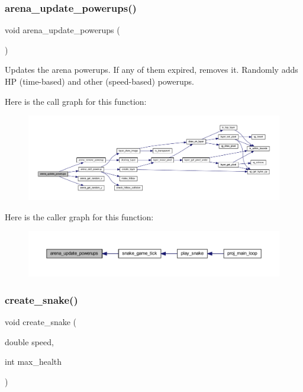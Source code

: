 \subsubsection{\texorpdfstring{arena\+\_\+update\+\_\+powerups()}{arena\_update\_powerups()}}
{\footnotesize\ttfamily void arena\+\_\+update\+\_\+powerups (\begin{DoxyParamCaption}{ }\end{DoxyParamCaption})}



Updates the arena powerups. If any of them expired, removes it. Randomly adds HP (time-\/based) and other (speed-\/based) powerups. 

Here is the call graph for this function\+:\nopagebreak
\begin{figure}[H]
\begin{center}
\leavevmode
\includegraphics[width=350pt]{group__snake_gac5b60c5a2d1ca79c4983372122b5183a_cgraph}
\end{center}
\end{figure}
Here is the caller graph for this function\+:\nopagebreak
\begin{figure}[H]
\begin{center}
\leavevmode
\includegraphics[width=350pt]{group__snake_gac5b60c5a2d1ca79c4983372122b5183a_icgraph}
\end{center}
\end{figure}
\mbox{\label{group__snake_gadcb5c41dcab72f6e0a7cd5d037c0d744}} 
\subsubsection{\texorpdfstring{create\+\_\+snake()}{create\_snake()}}
{\footnotesize\ttfamily void create\+\_\+snake (\begin{DoxyParamCaption}\item[{double}]{speed,  }\item[{int}]{max\+\_\+health }\end{DoxyParamCaption})}



